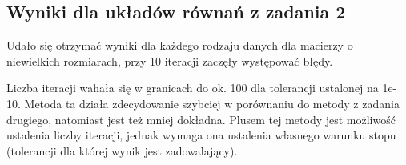 \documentclass[11pt]{article} %
\begin{document}
\subsection{Wyniki dla układów równań z zadania 2}
Udało się otrzymać wyniki dla każdego rodzaju danych dla macierzy o niewielkich rozmiarach, przy 10 iteracji zaczęły występować błędy.

Liczba iteracji wahała się w granicach do ok. 100 dla tolerancji ustalonej na 1e-10.
Metoda ta działa zdecydowanie szybciej w porównaniu do metody z zadania drugiego, natomiast jest też mniej dokładna. Plusem tej metody jest możliwość ustalenia liczby iteracji, jednak wymaga ona ustalenia własnego warunku stopu (tolerancji dla której wynik jest zadowalający).
\end{document}
